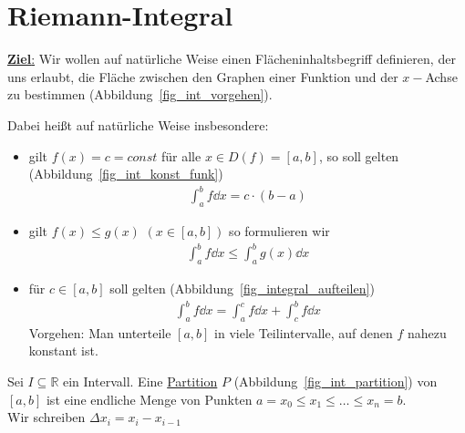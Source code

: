 \section{Riemann-Integral}\label{kap_riemann_integral}
\underline{\textbf{Ziel}:} Wir wollen auf \glqq{} natürliche\grqq{} Weise einen 
Flächeninhaltsbegriff definieren, der uns erlaubt, die Fläche zwischen den Graphen 
einer Funktion und der $x-$Achse zu bestimmen (Abbildung~\ref{fig_int_vorgehen}).
	
	
Dabei heißt auf \glqq natürliche Weise\grqq{} insbesondere: 
\begin{itemize}
	\item gilt $f(x) = c = const$ für alle $x \in D (f) = [a,b]$, so soll 
	gelten (Abbildung~\ref{fig_int_konst_funk})
	\begin{align*}
		\int_a^b f \dd{x} = c \cdot ( b - a)
	\end{align*}
	
	
	\item gilt $f(x) \leq g(x)$ $(x \in [a,b])$ so formulieren wir
	\begin{align*}
		\int_a^b f \dd{x} \leq \int_a^b g(x) \dd{x} 
	\end{align*}
	
	\item für $c \in [a,b]$ soll gelten (Abbildung~\ref{fig_integral_aufteilen})
	\begin{align*}
		\int_a^b f \dd{x} = \int_a^c f \dd{x} + \int_c^b f\dd{x}
	\end{align*}
	Vorgehen: Man unterteile $[a,b]$ in \glqq viele\grqq{} Teilintervalle, auf denen 
	$f$ nahezu konstant ist.
	
\end{itemize} 

\begin{Definition}{
	Sei $ I \subseteq \mathbb{R}$ ein Intervall. Eine \underline{Partition} $P$ 
	(Abbildung~\ref{fig_int_partition}) von 
	$[a,b]$ ist eine endliche Menge von Punkten $a = x_0 \leq x_1 \leq \hdots
	\leq x_n = b$.\\
	Wir schreiben $\Delta x_i = x_i - x_{i-1}$
	
}\end{Definition}

